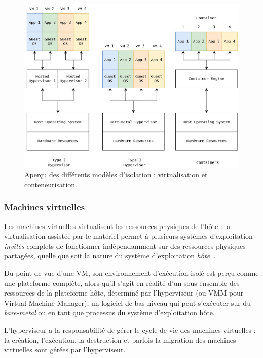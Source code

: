 \begin{figure}[htbp]
    \centering
	\includegraphics[width=\textwidth]{3_Chapitre1/figures/virtualization.png}
	\caption{Aperçu des différents modèles d'isolation : virtualisation et conteneurisation.}
	\label{fig:virtualization}
\end{figure}

\subsubsection{Machines virtuelles}

Les machines virtuelles virtualisent les ressources physiques de l'hôte : la virtualisation assistée par le matériel permet à plusieurs systèmes d'exploitation \textit{invités} complets de fonctionner indépendamment sur des ressources physiques partagées, quelle que soit la nature du système d'exploitation \textit{hôte}~\cite{kivityKvmLinuxVirtual}.

Du point de vue d'une VM, son environnement d'exécution isolé est perçu comme une plateforme complète, alors qu'il s'agit en réalité d'un sous-ensemble des ressources de la plateforme hôte, déterminé par l'hyperviseur (ou VMM pour Virtual Machine Manager), un logiciel de bas niveau qui peut s'exécuter sur du \textit{bare-metal} ou en tant que processus du système d'exploitation hôte.

L'hyperviseur a la responsabilité de gérer le cycle de vie des machines virtuelles : la création, l'exécution, la destruction et parfois la migration des machines virtuelles sont gérées par l'hyperviseur.

